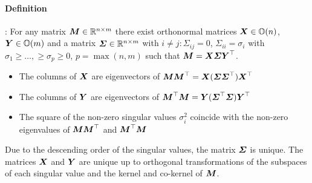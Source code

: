\paragraph{Definition}
\cite[Theo.\ 2.5.2]{Golub:MatrixComputations}:
For any matrix $\boldsymbol{M} \in \mathbb{R}^{n\times m}$ there exist orthonormal matrices $\boldsymbol{X} \in \mathbb{O}(n)$, $\boldsymbol{Y} \in \mathbb{O}(m)$ and a matrix $\boldsymbol{\varSigma} \in \mathbb{R}^{n\times m}$ with $i\neq j : \varSigma_{ij} = 0$, $\varSigma_{ii} = \sigma_i$ with $\sigma_1 \geq \ldots, \geq \sigma_p \geq 0$, $p=\max(n,m)$ such that $\boldsymbol{M} = \boldsymbol{X} \boldsymbol{\varSigma} \boldsymbol{Y}^\top$.
\begin{itemize}
 \item The columns of $\boldsymbol{X}$ are eigenvectors of $\boldsymbol{M} \boldsymbol{M}^\top = \boldsymbol{X} (\boldsymbol{\varSigma} \boldsymbol{\varSigma}^\top) \boldsymbol{X}^\top$
 \item The columns of $\boldsymbol{Y}$ are eigenvectors of $\boldsymbol{M}^\top \boldsymbol{M} = \boldsymbol{Y} (\boldsymbol{\varSigma}^\top \boldsymbol{\varSigma}) \boldsymbol{Y}^\top$
 \item The square of the non-zero singular values $\sigma_i^2$ coincide with the non-zero eigenvalues of $\boldsymbol{M} \boldsymbol{M}^\top$ and $\boldsymbol{M}^\top \boldsymbol{M}$
\end{itemize}
Due to the descending order of the singular values, the matrix $\boldsymbol{\varSigma}$ is unique.
The matrices $\boldsymbol{X}$ and $\boldsymbol{Y}$ are unique up to orthogonal transformations of the subspaces of each singular value and the kernel and co-kernel of $\boldsymbol{M}$.


